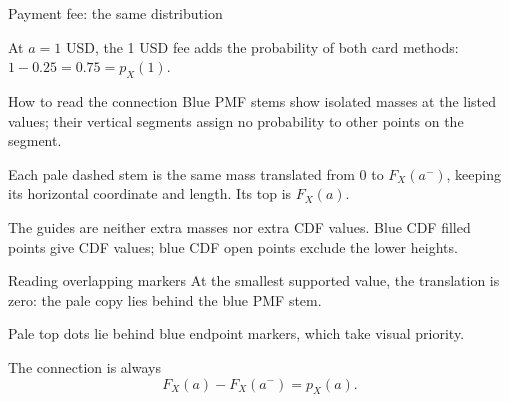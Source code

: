 \documentclass[12pt,aspectratio=169]{beamer}
\makeatletter
\newif\ifGTenHighlights
\newcommand{\GEHighlightMath}[2]{%
  \tikz[baseline=(gehl.base)]\node[ge marker=\GECurrentRole]
    (gehl) {$\m@th#1#2$};}
\newcommand{\GEHighlight}[2]{%
  \ifGTenHighlights\begingroup\def\GECurrentRole{#1}%
  \ifmmode\mathpalette\GEHighlightMath{#2}%
  \else\tikz[baseline=(gehl.base)]\node[ge marker=#1](gehl){#2};\fi
  \endgroup\else#2\fi}
\newcommand{\cTwoPhantom}[3]{%
\addplot[cTwoPhantom] coordinates {(#1,#3)(#1,{#3+#2})};
\addplot[only marks,mark=*,cTwoGuideColor,mark size=1.8pt]
coordinates {(#1,{#3+#2})};}
\newcommand{\cTwoMass}[2]{%
\addplot[cTwoMass] coordinates {(#1,0)(#1,#2)};
\addplot[only marks,mark=*,cTwoMassColor,mark size=1.5pt]
coordinates {(#1,#2)};}
\makeatother
\begin{document}
\begin{frame}[t]{Payment fee: the same distribution}
\par\medskip At $a=1$ USD, the 1 USD fee adds the probability of both card methods: $1-0.25=0.75=p_X(1)$.
\end{frame}
\begin{frame}[t]{How to read the connection}
Blue PMF stems show isolated masses at the listed values; their vertical segments assign no probability to other points on the segment.

Each pale dashed stem is the same mass translated from $0$ to $F_X(a^-)$, keeping its horizontal coordinate and length. Its top is $F_X(a)$.

The guides are neither extra masses nor extra CDF values. Blue CDF filled points give CDF values; blue CDF open points exclude the lower heights.
\end{frame}
\begin{frame}[t]{Reading overlapping markers}
At the smallest supported value, the translation is zero: the pale copy lies behind the blue PMF stem.

Pale top dots lie behind blue endpoint markers, which take visual priority.

\medskip The connection is always
\[F_X(a)-F_X(a^-)=p_X(a).\]
\end{frame}
\end{document}
